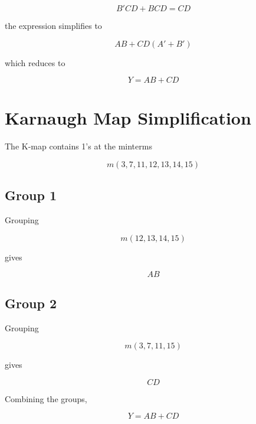 \documentclass[12pt,a4paper]{article}
\begin{document}
\begin{equation}
B'CD+BCD=CD
\end{equation}

the expression simplifies to

\begin{equation}
AB+CD(A'+B')
\end{equation}

which reduces to

\begin{equation}
\boxed{Y=AB+CD}
\end{equation}

\section*{Karnaugh Map Simplification}

The K-map contains 1's at the minterms

\begin{equation}
m(3,7,11,12,13,14,15)
\end{equation}

\subsection*{Group 1}

Grouping

\begin{equation}
m(12,13,14,15)
\end{equation}

gives

\begin{equation}
AB
\end{equation}

\subsection*{Group 2}

Grouping

\begin{equation}
m(3,7,11,15)
\end{equation}

gives

\begin{equation}
CD
\end{equation}

Combining the groups,

\begin{equation}
\boxed{Y=AB+CD}
\end{equation}
\end{document}
